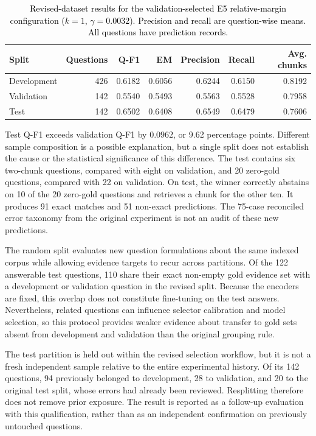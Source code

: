 \documentclass[11pt]{article}
\newcommand{\revision}[1]{#1}
\begin{document}
\begin{table}[t]
\centering

\small
\begin{tabular}{lrrrrrr}
\toprule
\textbf{Split} & \textbf{Questions} & \textbf{Q-F1} & \textbf{EM} & \textbf{Precision} & \textbf{Recall} & \textbf{Avg. chunks} \\
\midrule
Development & 426 & 0.6182 & 0.6056 & 0.6244 & 0.6150 & 0.8192 \\
Validation & 142 & 0.5540 & 0.5493 & 0.5563 & 0.5528 & 0.7958 \\
Test & 142 & 0.6502 & 0.6408 & 0.6549 & 0.6479 & 0.7606 \\
\bottomrule
\end{tabular}
\caption{\textcolor{black}{Revised-dataset results for the validation-selected E5 relative-margin configuration ($k=1$, $\gamma=0.0032$). Precision and recall are question-wise means. All questions have prediction records.}}
\label{tab:follow-up}
\end{table}

\revision{Test Q-F1 exceeds validation Q-F1 by $0.0962$, or 9.62 percentage points. Different sample composition is a possible explanation, but a single split does not establish the cause or the statistical significance of this difference. The test contains six two-chunk questions, compared with eight on validation, and 20 zero-gold questions, compared with 22 on validation. On test, the winner correctly abstains on 10 of the 20 zero-gold questions and retrieves a chunk for the other ten. It produces 91 exact matches and 51 non-exact predictions. The 75-case reconciled error taxonomy from the original experiment is not an audit of these new predictions.}

\revision{The random split evaluates new question formulations about the same indexed corpus while allowing evidence targets to recur across partitions. Of the 122 answerable test questions, 110 share their exact non-empty gold evidence set with a development or validation question in the revised split. Because the encoders are fixed, this overlap does not constitute fine-tuning on the test answers. Nevertheless, related questions can influence selector calibration and model selection, so this protocol provides weaker evidence about transfer to gold sets absent from development and validation than the original grouping rule.}

\revision{The test partition is held out within the revised selection workflow, but it is not a fresh independent sample relative to the entire experimental history. Of its 142 questions, 94 previously belonged to development, 28 to validation, and 20 to the original test split, whose errors had already been reviewed. Resplitting therefore does not remove prior exposure. The result is reported as a follow-up evaluation with this qualification, rather than as an independent confirmation on previously untouched questions.}
\end{document}

